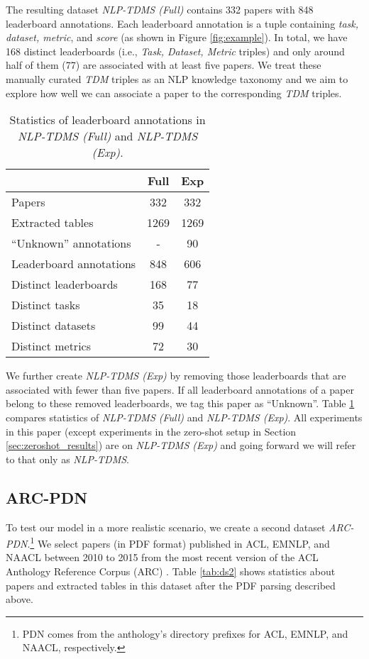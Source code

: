 \documentclass[11pt,a4paper]{article}
\begin{document}
The resulting dataset \emph{NLP-TDMS (Full)} contains 332 papers with 848 leaderboard annotations. Each leaderboard annotation is a tuple containing \emph{task, dataset, metric}, and \emph{score} (as shown in Figure \ref{fig:example}). In total, we have 168 distinct leaderboards (i.e., \emph{Task, Dataset, Metric} triples) and only around half of them (77) are associated with at least five papers. We treat these manually curated  \emph{TDM} triples as an NLP knowledge taxonomy and we aim to explore how well we can associate a paper to the corresponding \emph{TDM} triples.

\begin{table}[t]
\begin{center}
\begin{tabular}{@{}lcc@{}}
&Full&Exp\\ \hline
Papers   &332&332\\ Extracted tables   &1269&1269\\ ``Unknown'' annotations &-&90\\ \hline 
Leaderboard annotations &  848&606\\ 
\enspace\enspace Distinct leaderboards& 168&77\\
\enspace\enspace Distinct tasks & 35&18\\
\enspace\enspace Distinct datasets &99&44\\
\enspace\enspace Distinct metrics & 72&30\\
 \hline
\end{tabular}
\end{center}
\caption{\label{tab:ds1}  Statistics of leaderboard annotations in \emph{NLP-TDMS (Full)} and \emph{NLP-TDMS (Exp)}.}
\end{table}


We further create \emph{NLP-TDMS (Exp)} by removing those leaderboards that are associated with fewer than five papers. If all leaderboard annotations of a paper belong to 
these removed leaderboards, we tag this paper as ``Unknown''. Table \ref{tab:ds1} compares 
statistics of \emph{NLP-TDMS (Full)} and \emph{NLP-TDMS (Exp)}.
All experiments in this paper (except experiments in the zero-shot setup in Section \ref{sec:zeroshot_results}) are on \emph{NLP-TDMS (Exp)} and going forward we will refer to that only as \emph{NLP-TDMS}.





\subsection{ARC-PDN}
\label{sec:ds2}
To test our model in a more realistic scenario, we create a second dataset \emph{ARC-PDN}.\footnote{PDN comes from the anthology's directory prefixes for ACL, EMNLP, and NAACL, respectively.}
We select papers (in PDF format) published in ACL, EMNLP, and NAACL between 2010 to 2015 from the most recent version of the ACL Anthology Reference Corpus (ARC) \cite{L08-1005}.
Table \ref{tab:ds2} shows statistics about papers and extracted tables in this dataset after the PDF parsing described above.
\end{document}
